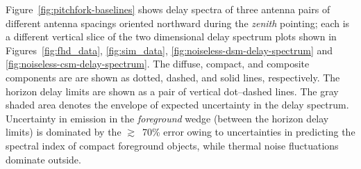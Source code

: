 \documentclass[preprint2,iop,numberedappendix]{emulateapj}
\begin{document}
Figure~\ref{fig:pitchfork-baselines} shows delay spectra of three antenna pairs of different antenna spacings oriented northward during the {\it zenith} pointing; each is a different vertical slice of the two dimensional delay spectrum plots shown in Figures~\ref{fig:fhd_data}, \ref{fig:sim_data}, \ref{fig:noiseless-dsm-delay-spectrum} and \ref{fig:noiseless-csm-delay-spectrum}. The diffuse, compact, and composite components are are shown as dotted, dashed, and solid lines, respectively. The horizon delay limits are shown as a pair of vertical dot--dashed lines. The gray shaded area denotes the envelope of expected uncertainty in the delay spectrum. Uncertainty in emission in the {\it foreground} wedge (between the horizon delay limits) is dominated by the $\gtrsim$~70\% error owing to uncertainties in predicting the spectral index of compact foreground objects, while thermal noise fluctuations dominate outside. 
\end{document}
